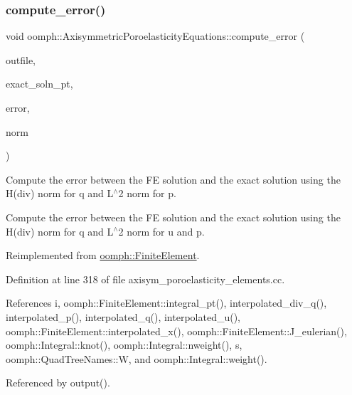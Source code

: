 \subsubsection{\texorpdfstring{compute\+\_\+error()}{compute\_error()}\hspace{0.1cm}{\footnotesize\ttfamily [1/2]}}
{\footnotesize\ttfamily void oomph\+::\+Axisymmetric\+Poroelasticity\+Equations\+::compute\+\_\+error (\begin{DoxyParamCaption}\item[{std\+::ostream \&}]{outfile,  }\item[{\hyperlink{classoomph_1_1FiniteElement_a690fd33af26cc3e84f39bba6d5a85202}{Finite\+Element\+::\+Steady\+Exact\+Solution\+Fct\+Pt}}]{exact\+\_\+soln\+\_\+pt,  }\item[{\hyperlink{classoomph_1_1Vector}{Vector}$<$ double $>$ \&}]{error,  }\item[{\hyperlink{classoomph_1_1Vector}{Vector}$<$ double $>$ \&}]{norm }\end{DoxyParamCaption})\hspace{0.3cm}{\ttfamily [virtual]}}



Compute the error between the FE solution and the exact solution using the H(div) norm for q and L$^\wedge$2 norm for p. 

Compute the error between the FE solution and the exact solution using the H(div) norm for q and L$^\wedge$2 norm for u and p. 

Reimplemented from \hyperlink{classoomph_1_1FiniteElement_a745d818aa291fe61538117c5f6c2b294}{oomph\+::\+Finite\+Element}.



Definition at line 318 of file axisym\+\_\+poroelasticity\+\_\+elements.\+cc.



References i, oomph\+::\+Finite\+Element\+::integral\+\_\+pt(), interpolated\+\_\+div\+\_\+q(), interpolated\+\_\+p(), interpolated\+\_\+q(), interpolated\+\_\+u(), oomph\+::\+Finite\+Element\+::interpolated\+\_\+x(), oomph\+::\+Finite\+Element\+::\+J\+\_\+eulerian(), oomph\+::\+Integral\+::knot(), oomph\+::\+Integral\+::nweight(), s, oomph\+::\+Quad\+Tree\+Names\+::W, and oomph\+::\+Integral\+::weight().



Referenced by output().

\mbox{\label{classoomph_1_1AxisymmetricPoroelasticityEquations_ac9251e1be3256755cdbacca9748f614b}} 
